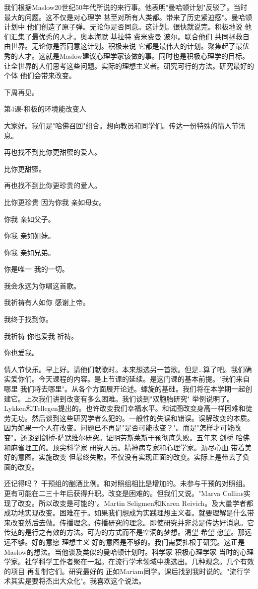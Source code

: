 我们根据Maslow20世纪50年代所说的来行事。他表明"曼哈顿计划"反驳了。当时最大的问题。这不仅是对心理学 甚至对所有人类都。带来了历史紧迫感"。曼哈顿计划中 他们创造了原子弹。无论你是否同意。这计划。很快就说完。积极地说 他们汇集了最优秀的人才。奥本海默 基拉特 费米费曼 波尔。联合他们 共同拯救自由世界。无论你是否同意这计划。积极来说 它都是最伟大的计划。聚集起了最优秀的人才。这就是Maslow建议心理学家该做的事。同时也是积极心理学的目标。让全世界的人们思考这些问题。实际的理想主义者。研究可行的方法。研究最好的个体 他们会带来改变。 

下周再见。 

第4课-积极的环境能改变人 

大家好。我们是"哈佛召回"组合。想向教员和同学们。传达一份特殊的情人节讯息。 

再也找不到比你更甜蜜的爱人。 

比你更甜蜜。 

再也找不到比你更珍贵的爱人。 

比你更珍贵 因为你我 亲如母女。 

你我 亲如父子。 

你我 亲如姐妹。 

你我 亲如兄弟。 

你是唯一 我的一切。 

我会永远为你唱这首歌。 

我祈祷有人如你 感谢上帝。 

我终于找到你。 

我祈祷 你也爱我 祈祷。 

你也爱我。 

情人节快乐。早上好。请他们献歌时。本来想选另一首歌。但是…算了吧。我们确实爱你们。今天课程的内容。是上节课的延续。是这门课的基本前提。"我们来自哪里 我们将去哪里"。从各个方面展开论述。螺旋的基础。我们将在本学期一起创建它。上次我们讲到改变有多么困难。我们谈到"双胞胎研究" 举例说明了。Lykken和Tellegen提出的。也许改变我们幸福水平。和试图改变身高一样困难和徒劳无功。然后谈到这些研究学者么犯的。一般性的失误和错误。误解改变的本质。因为如果一个人在改变。问题已不再是"是否可能改变？"。而是"怎样才可能改变"。还谈到剑桥-萨默维尔研究。证明劳斯莱斯干预彻底失败。五年来 剑桥 哈佛和麻省理工的。顶尖科学家 研究人员。精神病专家和心理学家。沥尽心血 带着美好的意图。实施改变 但最终失败。不仅没有实现正面的改变。实际上是带去了负面的改变。 

还记得吗？ 干预组的酗酒比例。和对照组相比是增加的。未参与干预的对照组。更有可能在二三十年后获得升职。改变是困难的。但我们又说。"Marva Collins实现了改变。所以改变是可能的"。Martin Seligmen和Karen Reivich。及大量学者都成功地实现改变。困难在于。如果我们想成为实践理想主义者。就要理解是什么带来改变然后去做。传播理念。传播研究的理念。即使研究并非总是传达好消息。它传达的是行之有效的方法。可为的方式而不是空洞的梦想。渴望 希望 愿望。那远远不够。好的意愿 理想主义 好的意图是不够的。我们需要扎根于研究。这正是Maslow的想法。当他谈及类似的曼哈顿计划时。科学家 积极心理学家 当时的心理学家。社学科学工作者聚在一起。在流行学术领域中挑选出。几种观念。几个有效的项目 再复制它们。研究最好的 正如Mariam同学。课后找到我时说的。"流行学术其实是要将杰出大众化"。我喜欢这个说法。 


